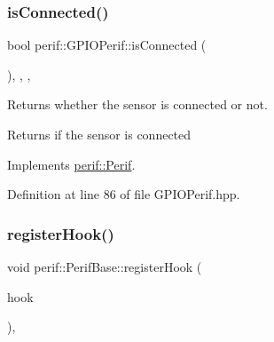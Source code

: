 \begin{DoxyCode}{0}

\end{DoxyCode}
\mbox{\label{classperif_1_1GPIOPerif_ae7c93b409fd4d4d49f9f8eddae612b3e}} 
\subsubsection{\texorpdfstring{isConnected()}{isConnected()}}
{\footnotesize\ttfamily bool perif\+::\+G\+P\+I\+O\+Perif\+::is\+Connected (\begin{DoxyParamCaption}{ }\end{DoxyParamCaption})\hspace{0.3cm}{\ttfamily [inline]}, {\ttfamily [override]}, {\ttfamily [virtual]}, {\ttfamily [inherited]}}

Returns whether the sensor is connected or not.

\begin{DoxyReturn}{Returns}
if the sensor is connected 
\end{DoxyReturn}


Implements \mbox{\hyperlink{classperif_1_1Perif_ab9a17fad04e595f3ac0c78b9d3be4c9e}{perif\+::\+Perif}}.



Definition at line 86 of file G\+P\+I\+O\+Perif.\+hpp.


\begin{DoxyCode}{0}

\end{DoxyCode}
\mbox{\label{classperif_1_1PerifBase_a2e8bcc221ee253b21b61c7c07307d931}} 
\subsubsection{\texorpdfstring{registerHook()}{registerHook()}}
{\footnotesize\ttfamily void perif\+::\+Perif\+Base\+::register\+Hook (\begin{DoxyParamCaption}\item[{function$<$ void(\mbox{\hyperlink{Perif_8hpp_a358ff4ee6d24694ee7661f0cce14377e}{Dev\+Map}} \&)$>$ \&\&}]{hook }\end{DoxyParamCaption})\hspace{0.3cm}{\ttfamily [inline]}, {\ttfamily [inherited]}}


